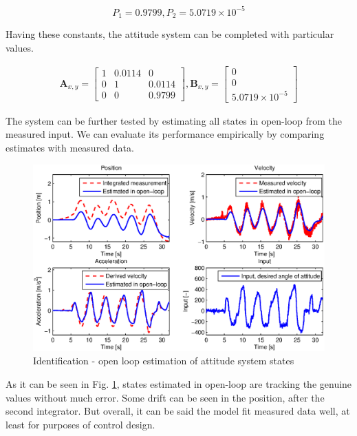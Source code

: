 \begin{equation}
P_1 = 0.9799, P_2 = 5.0719 \times 10^{-5} 
\label{eq:constants1}
\end{equation}

Having these constants, the attitude system can be completed with particular values. 

\begin{equation}
\begin{split}
\mathbf{A}_{x, y} = \begin{bmatrix}
1 & 0.0114 & 0 \\
0 & 1 & 0.0114 \\
0 & 0 & 0.9799
\end{bmatrix}, \mathbf{B}_{x, y} = \begin{bmatrix}
0\\
0\\
5.0719 \times 10^{-5}
\end{bmatrix}
\end{split}
\end{equation}

The system can be further tested by estimating all states in open-loop from the measured input. We can evaluate its performance empirically by comparing estimates with measured data.

\begin{figure}[h]
\includegraphics[width=1\textwidth]{fig/iden2.eps} 
\caption{Identification - open loop estimation of attitude system states}
\label{fig:iden2}
\end{figure}

As it can be seen in Fig. \ref{fig:iden2}, states estimated in open-loop are tracking the genuine values without much error. Some drift can be seen in the position, after the second integrator. But overall, it can be said the model fit measured data well, at least for purposes of control design. 

